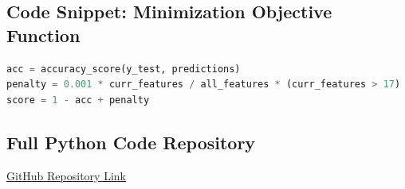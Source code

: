 \documentclass[12pt]{article}
\begin{document}
\subsection*{Code Snippet: Minimization Objective Function}
\begin{lstlisting}[language=Python, basicstyle=\ttfamily\small]
acc = accuracy_score(y_test, predictions)
penalty = 0.001 * curr_features / all_features * (curr_features > 17)
score = 1 - acc + penalty
\end{lstlisting}

\subsection*{Full Python Code Repository}
\href{https://github.com/ENSIA-AI/NMO-Alpha-PSO}{GitHub Repository Link}

\newpage


\end{document}
